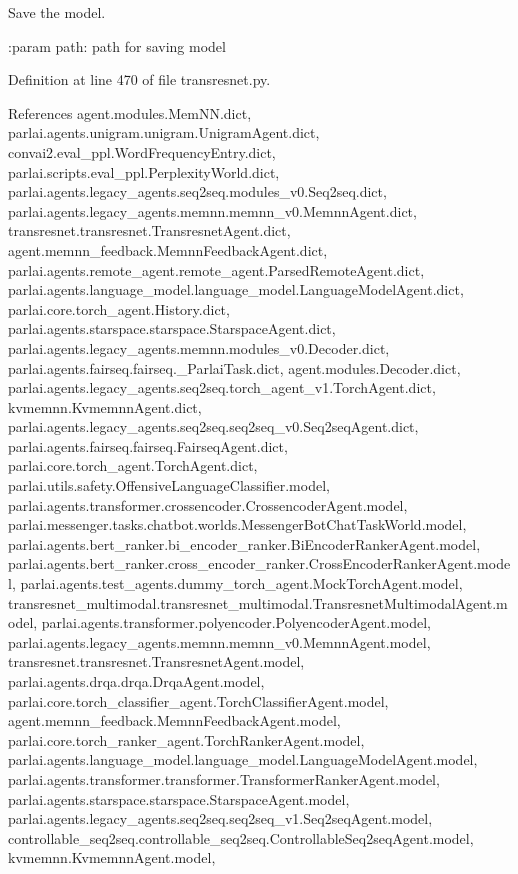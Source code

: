 \begin{DoxyVerb}Save the model.

:param path:
    path for saving model
\end{DoxyVerb}
 

Definition at line 470 of file transresnet.\+py.



References agent.\+modules.\+Mem\+N\+N.\+dict, parlai.\+agents.\+unigram.\+unigram.\+Unigram\+Agent.\+dict, convai2.\+eval\+\_\+ppl.\+Word\+Frequency\+Entry.\+dict, parlai.\+scripts.\+eval\+\_\+ppl.\+Perplexity\+World.\+dict, parlai.\+agents.\+legacy\+\_\+agents.\+seq2seq.\+modules\+\_\+v0.\+Seq2seq.\+dict, parlai.\+agents.\+legacy\+\_\+agents.\+memnn.\+memnn\+\_\+v0.\+Memnn\+Agent.\+dict, transresnet.\+transresnet.\+Transresnet\+Agent.\+dict, agent.\+memnn\+\_\+feedback.\+Memnn\+Feedback\+Agent.\+dict, parlai.\+agents.\+remote\+\_\+agent.\+remote\+\_\+agent.\+Parsed\+Remote\+Agent.\+dict, parlai.\+agents.\+language\+\_\+model.\+language\+\_\+model.\+Language\+Model\+Agent.\+dict, parlai.\+core.\+torch\+\_\+agent.\+History.\+dict, parlai.\+agents.\+starspace.\+starspace.\+Starspace\+Agent.\+dict, parlai.\+agents.\+legacy\+\_\+agents.\+memnn.\+modules\+\_\+v0.\+Decoder.\+dict, parlai.\+agents.\+fairseq.\+fairseq.\+\_\+\+Parlai\+Task.\+dict, agent.\+modules.\+Decoder.\+dict, parlai.\+agents.\+legacy\+\_\+agents.\+seq2seq.\+torch\+\_\+agent\+\_\+v1.\+Torch\+Agent.\+dict, kvmemnn.\+Kvmemnn\+Agent.\+dict, parlai.\+agents.\+legacy\+\_\+agents.\+seq2seq.\+seq2seq\+\_\+v0.\+Seq2seq\+Agent.\+dict, parlai.\+agents.\+fairseq.\+fairseq.\+Fairseq\+Agent.\+dict, parlai.\+core.\+torch\+\_\+agent.\+Torch\+Agent.\+dict, parlai.\+utils.\+safety.\+Offensive\+Language\+Classifier.\+model, parlai.\+agents.\+transformer.\+crossencoder.\+Crossencoder\+Agent.\+model, parlai.\+messenger.\+tasks.\+chatbot.\+worlds.\+Messenger\+Bot\+Chat\+Task\+World.\+model, parlai.\+agents.\+bert\+\_\+ranker.\+bi\+\_\+encoder\+\_\+ranker.\+Bi\+Encoder\+Ranker\+Agent.\+model, parlai.\+agents.\+bert\+\_\+ranker.\+cross\+\_\+encoder\+\_\+ranker.\+Cross\+Encoder\+Ranker\+Agent.\+model, parlai.\+agents.\+test\+\_\+agents.\+dummy\+\_\+torch\+\_\+agent.\+Mock\+Torch\+Agent.\+model, transresnet\+\_\+multimodal.\+transresnet\+\_\+multimodal.\+Transresnet\+Multimodal\+Agent.\+model, parlai.\+agents.\+transformer.\+polyencoder.\+Polyencoder\+Agent.\+model, parlai.\+agents.\+legacy\+\_\+agents.\+memnn.\+memnn\+\_\+v0.\+Memnn\+Agent.\+model, transresnet.\+transresnet.\+Transresnet\+Agent.\+model, parlai.\+agents.\+drqa.\+drqa.\+Drqa\+Agent.\+model, parlai.\+core.\+torch\+\_\+classifier\+\_\+agent.\+Torch\+Classifier\+Agent.\+model, agent.\+memnn\+\_\+feedback.\+Memnn\+Feedback\+Agent.\+model, parlai.\+core.\+torch\+\_\+ranker\+\_\+agent.\+Torch\+Ranker\+Agent.\+model, parlai.\+agents.\+language\+\_\+model.\+language\+\_\+model.\+Language\+Model\+Agent.\+model, parlai.\+agents.\+transformer.\+transformer.\+Transformer\+Ranker\+Agent.\+model, parlai.\+agents.\+starspace.\+starspace.\+Starspace\+Agent.\+model, parlai.\+agents.\+legacy\+\_\+agents.\+seq2seq.\+seq2seq\+\_\+v1.\+Seq2seq\+Agent.\+model, controllable\+\_\+seq2seq.\+controllable\+\_\+seq2seq.\+Controllable\+Seq2seq\+Agent.\+model, kvmemnn.\+Kvmemnn\+Agent.\+model, 